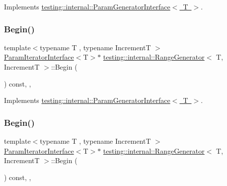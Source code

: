 Implements \mbox{\hyperlink{classtesting_1_1internal_1_1_param_generator_interface_ae1de83b16fe9a53c67778a026c6a9569}{testing\+::internal\+::\+Param\+Generator\+Interface$<$ T $>$}}.

\mbox{\label{classtesting_1_1internal_1_1_range_generator_a502913fbcf14e89d5765dfb44f3c1295}} 
\subsubsection{\texorpdfstring{Begin()}{Begin()}\hspace{0.1cm}{\footnotesize\ttfamily [2/3]}}
{\footnotesize\ttfamily template$<$typename T , typename IncrementT $>$ \\
\mbox{\hyperlink{classtesting_1_1internal_1_1_param_iterator_interface}{Param\+Iterator\+Interface}}$<$T$>$$\ast$ \mbox{\hyperlink{classtesting_1_1internal_1_1_range_generator}{testing\+::internal\+::\+Range\+Generator}}$<$ T, IncrementT $>$\+::Begin (\begin{DoxyParamCaption}{ }\end{DoxyParamCaption}) const\hspace{0.3cm}{\ttfamily [inline]}, {\ttfamily [override]}, {\ttfamily [virtual]}}



Implements \mbox{\hyperlink{classtesting_1_1internal_1_1_param_generator_interface_ae1de83b16fe9a53c67778a026c6a9569}{testing\+::internal\+::\+Param\+Generator\+Interface$<$ T $>$}}.

\mbox{\label{classtesting_1_1internal_1_1_range_generator_a502913fbcf14e89d5765dfb44f3c1295}} 
\subsubsection{\texorpdfstring{Begin()}{Begin()}\hspace{0.1cm}{\footnotesize\ttfamily [3/3]}}
{\footnotesize\ttfamily template$<$typename T , typename IncrementT $>$ \\
\mbox{\hyperlink{classtesting_1_1internal_1_1_param_iterator_interface}{Param\+Iterator\+Interface}}$<$T$>$$\ast$ \mbox{\hyperlink{classtesting_1_1internal_1_1_range_generator}{testing\+::internal\+::\+Range\+Generator}}$<$ T, IncrementT $>$\+::Begin (\begin{DoxyParamCaption}{ }\end{DoxyParamCaption}) const\hspace{0.3cm}{\ttfamily [inline]}, {\ttfamily [override]}, {\ttfamily [virtual]}}



